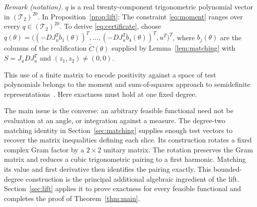 \noindent\textit{Remark (notation).} $q$ is a real twenty-component trigonometric polynomial vector in $(\mathcal T_2)^{20}$. In Proposition~\ref{prop:lift}: The constraint \eqref{eq:moment} ranges over every $q\in(\mathcal T_2)^{20}$. To derive \eqref{eq:certificate}, choose $q(\theta)=\bigl((-DJ_u^Tb_1(\theta))^T,\ldots,(-DJ_u^Tb_4(\theta))^T,u^T\bigr)^T$, where $b_j(\theta)$ are the columns of the realification $\widetilde C(\theta)$ supplied by Lemma~\ref{lem:matching} with $S=J_uDJ_u^T$ and $(z_1,z_2)\neq(0,0)$.


This use of a finite matrix to encode positivity against a space of
test polynomials belongs to the moment and sum-of-squares approach to
semidefinite representations~\cite{lasserre2001,lasserre2009}.
Here exactness must hold at one fixed degree.

The main issue is the converse: an arbitrary feasible functional need
not be evaluation at an angle, or integration against a measure.
The degree-two matching identity in Section~\ref{sec:matching} supplies
enough test vectors to recover the matrix inequalities defining each
slice. Its construction rotates a fixed complex Gram factor by a
$2\times2$ unitary matrix. The rotation preserves the Gram matrix and
reduces a cubic trigonometric pairing to a first harmonic. Matching
its value and first derivative then identifies the pairing exactly.
This bounded-degree construction is the principal additional algebraic
ingredient of the lift. Section~\ref{sec:lift} applies it to prove
exactness for every feasible functional and completes the proof of
Theorem~\ref{thm:main}.
